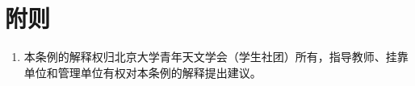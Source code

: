 \section{附则}

\begin{enumerate}[resume]
    \item 本条例的解释权归北京大学青年天文学会（学生社团）所有，指导教师、挂靠单位和管理单位有权对本条例的解释提出建议。
\end{enumerate}

